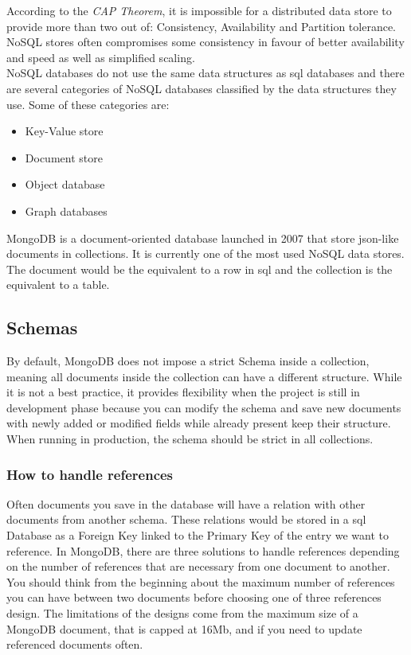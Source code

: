 \documentclass[twoside, openright,11pt,a4paper]{book}
\begin{document}
According to the \emph{CAP Theorem}\cite{wiki:cap_theorem}, it is impossible for a distributed data store to provide more than two out of: Consistency, Availability and Partition tolerance. NoSQL stores often compromises some consistency in favour of better availability and speed as well as simplified scaling. \\ 

NoSQL databases do not use the same data structures as \gls{sql} databases and there are several categories of NoSQL databases classified by the data structures they use. Some of these categories are:
\begin{itemize}
	\item Key-Value store
	\item Document store
	\item Object database
	\item Graph databases
\end{itemize}

MongoDB\cite{wiki:mongo} is a document-oriented database\cite{wiki:document_oriented_db} launched in 2007 that store \gls{json}-like documents in collections. It is currently one of the most used NoSQL data stores. The document would be the equivalent to a row in \gls{sql} and the collection is the equivalent to a table.

\subsection{Schemas}
By default, MongoDB does not impose a strict Schema inside a collection, meaning all documents inside the collection can have a different structure. While it is not a best practice, it provides flexibility when the project is still in development phase because you can modify the schema and save new documents with newly added or modified fields while already present keep their structure. When running in production, the schema should be strict in all collections. \\
\subsubsection{How to handle references}
\label{mongo_references}
Often documents you save in the database will have a relation with other documents from another schema. These relations would be stored in a \gls{sql} Database as a Foreign Key linked to the Primary Key of the entry we want to reference. In MongoDB, there are three solutions to handle references depending on the number of references that are necessary from one document to another. You should think from the beginning about the maximum number of references you can have between two documents before choosing one of three references design. The limitations of the designs come from the maximum size of a MongoDB document, that is capped at 16Mb, and if you need to update referenced documents often. \\
\end{document}
